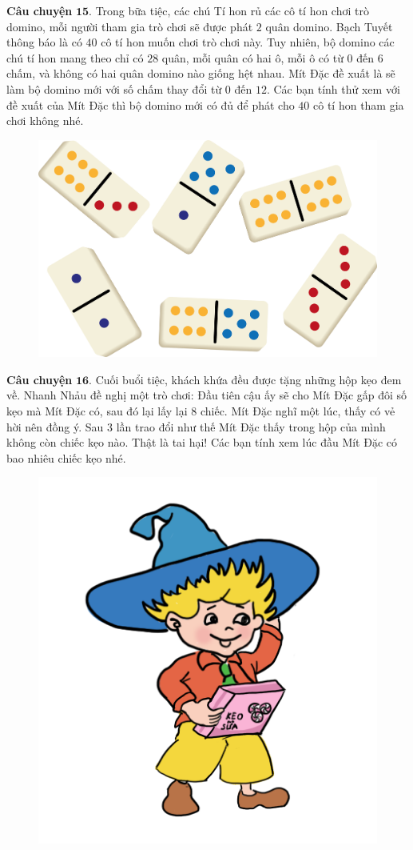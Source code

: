 	\textbf{\color{toancuabi}Câu chuyện} $\pmb{15.}$ Trong bữa tiệc, các chú Tí hon rủ các cô tí hon chơi trò domino, mỗi người tham gia trò chơi sẽ được phát $2$ quân domino. Bạch Tuyết thông báo là có $40$ cô tí hon muốn chơi trò chơi này. Tuy nhiên, bộ domino các chú tí hon mang theo chỉ có $28$ quân, mỗi quân có hai ô, mỗi ô có từ $0$ đến $6$ chấm, và không có hai quân domino nào giống hệt nhau. Mít Đặc đề xuất là sẽ làm bộ domino mới với số chấm thay đổi từ $0$ đến $12$. Các bạn tính thử xem với đề xuất của Mít Đặc thì bộ domino mới có đủ để phát cho $40$ cô tí hon tham gia chơi không nhé.
	\begin{figure}[H]
		\centering
		\vspace*{-5pt}
		\captionsetup{labelformat= empty, justification=centering}
		\includegraphics[width=0.6\linewidth]{Hinh17_Domino}
		\vspace*{-10pt}
	\end{figure}
	\textbf{\color{toancuabi}Câu chuyện} $\pmb{16.}$ Cuối buổi tiệc, khách khứa đều được tặng những hộp kẹo đem về. Nhanh Nhảu đề nghị một trò chơi: Đầu tiên cậu ấy sẽ cho Mít Đặc gấp đôi số kẹo mà Mít Đặc có, sau đó lại lấy lại $8$ chiếc. Mít Đặc nghĩ một lúc, thấy có vẻ hời nên đồng ý. Sau $3$ lần trao đổi như thế Mít Đặc thấy trong hộp của mình không còn chiếc kẹo nào. Thật là tai hại! Các bạn tính xem lúc đầu Mít Đặc có bao nhiêu chiếc kẹo nhé.
	\begin{figure}[H]
		\centering
		\vspace*{-5pt}
		\captionsetup{labelformat= empty, justification=centering}
		\includegraphics[width=0.3\linewidth]{Hinh18_MitDac}
		\vspace*{-10pt}
	\end{figure}
